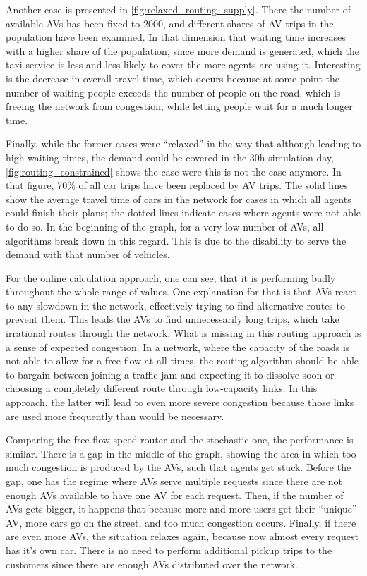 Another case is presented in \cref{fig:relaxed_routing_supply}. There the number
of available AVs has been fixed to 2000, and different shares of AV trips in the
population have been examined. In that dimension that waiting time increases with
a higher share of the population, since more demand is generated, which the taxi
service is less and less likely to cover the more agents are using it.
Interesting is the decrease in overall travel time, which occurs because at some
point the number of waiting people exceeds the number of people on the road, which
is freeing the network from congestion, while letting people wait for
a much longer time.

Finally, while the former cases were ``relaxed'' in the way that although leading
to high waiting times, the demand could be covered in the 30h simulation day, \cref{fig:routing_constrained}
shows the case were this is not the case anymore. In that figure, 70\% of all car
trips have been replaced by AV trips. The solid lines show the average travel time
of cars in the network for cases in which all agents could finish their plans; the
dotted lines indicate cases where agents were not able to do so. In the beginning
of the graph, for a very low number of AVs, all algorithms break down in this
regard. This is due to the disability to serve the demand with that number of
vehicles.

For the online calculation approach, one can see, that it is performing badly
throughout the whole range of values. One explanation for that
is that AVs react to any slowdown in the network, effectively trying to find alternative
routes to prevent them. This leads the AVs to find unnecessarily long trips, which
take irrational routes through the network. What is missing in this routing approach
is a sense of expected congestion. In a network, where the capacity of the roads is
not able to allow for a free flow at all times, the routing algorithm should
be able to bargain between joining a traffic jam and expecting it to dissolve soon
or choosing a completely different route through low-capacity links. In this approach,
the latter will lead to even more severe congestion because those links are used
more frequently than would be necessary.

Comparing the free-flow speed router and the stochastic one, the performance is similar.
There is a gap in the middle of the graph, showing the area in which too much
congestion is produced by the AVs, such that agents get stuck. Before the gap,
one has the regime where AVs serve multiple requests
since there are not enough AVs available to have one AV for each request. Then,
if the number of AVs gets bigger, it happens that because more and more users get
their ``unique'' AV, more cars go on the street, and too much congestion occurs.
Finally, if there are even more AVs, the situation relaxes again, because now
almost every request has it's own car. There is no need to perform additional
pickup trips to the customers since there are enough AVs distributed over the
network.

